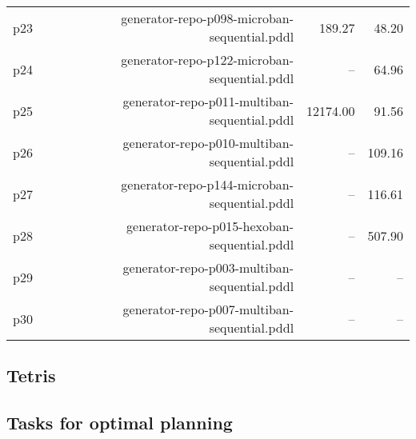 \documentclass{article}
\begin{document}
\begin{center}
\begin{tabular}{@{}l|r|r|r@{}}
  p23& generator-repo-p098-microban-sequential.pddl&189.27&48.20\\
  p24& generator-repo-p122-microban-sequential.pddl&--&64.96\\
  p25& generator-repo-p011-multiban-sequential.pddl&12174.00&91.56\\
  p26& generator-repo-p010-multiban-sequential.pddl&--&109.16\\
  p27& generator-repo-p144-microban-sequential.pddl&--&116.61\\
  p28& generator-repo-p015-hexoban-sequential.pddl&--&507.90\\
  p29& generator-repo-p003-multiban-sequential.pddl&--&--\\
  p30& generator-repo-p007-multiban-sequential.pddl&--&--
                            \end{tabular}
                            \end{center}
                    
                \newpage \subsection{Tetris}
                    \subsection*{Tasks for optimal planning}
                    
\end{document}
